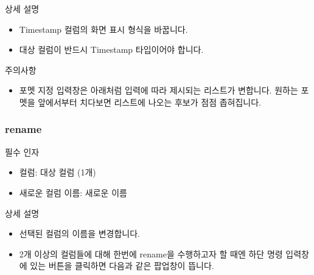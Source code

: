\documentclass[letterpaper,10pt,english]{sphinxmanual}
\begin{document}
상세 설명
\begin{itemize}
\item {} 
Timestamp 컬럼의 화면 표시 형식을 바꿉니다.

\item {} 
대상 컬럼이 반드시 Timestamp 타입이어야 합니다.

\end{itemize}

주의사항
\begin{itemize}
\item {} 
포멧 지정 입력창은 아래처럼 입력에 따라 제시되는 리스트가 변합니다. 원하는 포멧을 앞에서부터 치다보면 리스트에 나오는 후보가 점점 좁혀집니다.
\begin{quote}

\begin{figure}[H]
\centering

\noindent{}
\end{figure}
\end{quote}

\end{itemize}


\subsubsection{rename}
\label{\detokenize{discovery/part07/rule_kinds:rename}}
필수 인자
\begin{itemize}
\item {} 
컬럼: 대상 컬럼 (1개)

\item {} 
새로운 컬럼 이름: 새로운 이름

\end{itemize}

상세 설명
\begin{itemize}
\item {} 
선택된 컬럼의 이름을 변경합니다.

\item {} 
2개 이상의 컬럼들에 대해 한번에 rename을 수행하고자 할 때엔 하단 명령 입력창에 있는  버튼을 클릭하면 다음과 같은 팝업창이 뜹니다.
\begin{quote}

\begin{figure}[H]
\centering

\noindent{}
\end{figure}
\end{quote}

\end{itemize}
\end{document}
